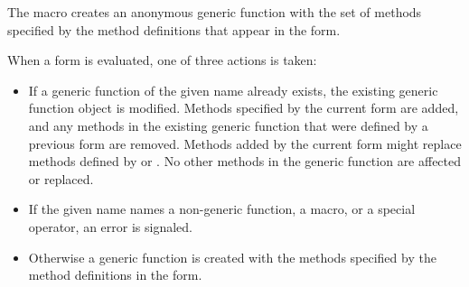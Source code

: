 


The  macro creates an anonymous generic
function with the set of methods specified by the method definitions that appear
in the  form.

When a  form is evaluated, one of three actions
is taken:

\begin{itemize}

\item  If a generic function of the given name already exists,
the existing generic function object is modified.  Methods specified
by the current  form are added, and any methods in the
existing generic function that were defined by a previous 
 form are removed.  Methods added by the current 
 form might replace methods defined by  or
.  No other methods in the generic function are affected
or replaced.

\item  If the given name names a non-generic function, a
macro, or a special operator, an error is signaled.

\item  Otherwise a generic function is created with the
methods specified by the method definitions in the 
form.
\end{itemize}

